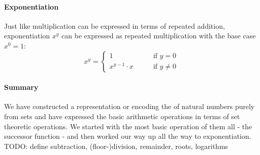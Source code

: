 \paragraph{Exponentiation} Just like multiplication can be expressed in terms of repeated addition, exponentiation $x^y$ can be expressed as repeated multiplication with the base case $x^0 = 1$:
\begin{equation}
x^y =\begin{cases}
 1                  & \qquad \text{if } y   =  0 \\
 x ^{y-1}  \cdot x  & \qquad \text{if } y \neq 0 
\end{cases}
\end{equation}

\paragraph{Summary} We have constructed a representation or encoding the of natural numbers purely from sets and have expressed the basic arithmetic operations in terms of set theoretic operations. We started with the most basic operation of them all - the successor function - and then worked our way up all the way to exponentiation. TODO: define subtraction, (floor-)division, remainder, roots, logarithms









